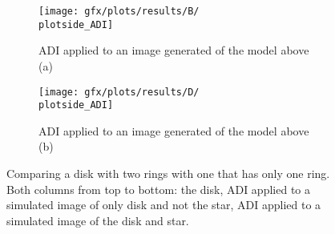 \begin{figure}[h!]
{\begin{minipage}[t]{1.2\textwidth}
      \begin{subfigure}[t]{0.6\textwidth}
        \texttt{[image: gfx/plots/results/B/\\plotside\_ADI]}
        \caption{\ac{ADI} applied to an image generated of the model above (a)}
        \label{fig:disk0_3}
      \end{subfigure}%
      \begin{subfigure}[t]{0.6\textwidth}
        \texttt{[image: gfx/plots/results/D/\\plotside\_ADI]}
        \caption{\ac{ADI} applied to an image generated of the model above (b)}
        \label{fig:disk1_3}
      \end{subfigure}
  \end{minipage}
  }%

  \caption{Comparing a disk with two rings with one that has only one ring. Both columns from top to bottom: the disk, \ac{ADI} applied to a simulated image of only disk and not the star, \ac{ADI} applied to a simulated image of the disk and star.}
  \label{fig:comp_numb_rings}
\end{figure}

